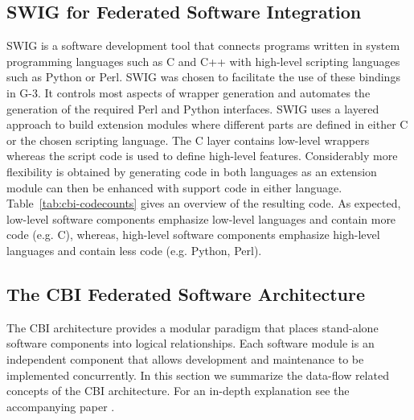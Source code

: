 \documentclass[10pt]{article}
\begin{document}
\subsection*{SWIG for Federated Software Integration}

SWIG is a software development tool that connects programs written
in system programming languages such as C and C++ with high-level scripting 
languages such as Python or Perl. SWIG was chosen to facilitate 
the use of these bindings in
G-3. It controls most aspects of wrapper
generation and automates the generation of the required Perl and
Python interfaces. SWIG uses a layered approach to build extension
modules where different parts are defined in either C or the chosen
scripting language. The C layer contains low-level wrappers whereas
the script code is used to define high-level features.  Considerably
more flexibility is obtained by generating code in both languages as
an extension module can then be enhanced with support code in either
language.  Table~\ref{tab:cbi-codecounts} gives an overview of the
resulting code.  As expected, low-level software components emphasize
low-level languages and contain more code (e.g. C), whereas, high-level
software components emphasize high-level languages and contain less
code (e.g. Python, Perl).


\subsection*{The CBI Federated Software Architecture}
\label{subsec:cbi}

The CBI architecture provides a modular paradigm that places stand-alone
software components into logical relationships.  Each software module
is an independent component that allows development and
maintenance to be implemented concurrently.
In this section we summarize the data-flow related concepts of the CBI
architecture.  For an in-depth explanation see the accompanying paper
\cite{cornelis11b}.
\end{document}
